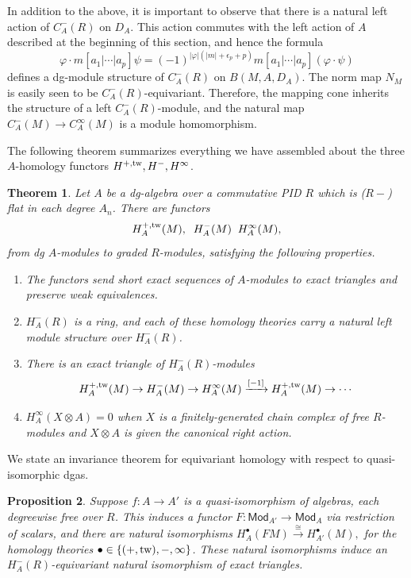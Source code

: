 \documentclass{memo-l}
\newtheorem{theorem}{Theorem}[chapter]
\newtheorem{proposition}[theorem]{Proposition}
\theoremstyle{definition}
\theoremstyle{remark}
\numberwithin{section}{chapter}
\numberwithin{equation}{chapter}
\begin{document}
In addition to the above, it is important to observe that there is a natural left action of $C^-_A(R)$ on $D_A$. This action commutes with the left action of $A$ described at the beginning of this section, and hence the formula $$\varphi \cdot m[a_1 | \cdots | a_p] \psi = (-1)^{|\varphi|(|m| + \epsilon_p+p)} m[a_1 | \cdots | a_p] (\varphi \cdot \psi)$$ defines a dg-module structure of $C^-_A(R)$ on $B(M, A, D_A).$ The norm map $N_M$ is easily seen to be $C^-_A(R)$-equivariant. Therefore, the mapping cone inherits the structure of a left $C^-_A(R)$-module, and the natural map $C^-_A(M) \to C^\infty_A(M)$ is a module homomorphism.

The following theorem summarizes everything we have assembled about the three $A$-homology functors $H^{+,\textup{tw}}, H^-, H^\infty$.

\begin{theorem}\label{eq-package}
Let $A$ be a dg-algebra over a commutative PID $R$ which is ($R-$) flat in each degree $A_n$. There are functors $$H^{+,\textup{tw}}_A(M), \; \; H^-_A(M) \; \; H^\infty_A(M),$$
from dg $A$-modules to graded $R$-modules, satisfying the following properties.
\begin{enumerate}
    \item The functors send short exact sequences of $A$-modules to exact triangles and preserve weak equivalences.
    \item $H_A^-(R)$ is a ring, and each of these homology theories carry a natural left module structure over $H_A^-(R)$.
    \item There is an exact triangle of $H_A^-(R)$-modules $$H^{+,\textup{tw}}_A(M) \to H_A^-(M) \to H_A^\infty(M) \xrightarrow{[-1]} H^{+,\textup{tw}}_A(M) \to \cdots$$
    \item $H_A^\infty(X \otimes A) = 0$ when $X$ is a finitely-generated chain complex of free $R$-modules and $X \otimes A$ is given the canonical right action.
    \end{enumerate}
\end{theorem}

We state an invariance theorem for equivariant homology with respect to quasi-isomorphic dgas.

\begin{proposition}\label{dg-invar}Suppose $f: A\to A'$ is a quasi-isomorphism of algebras, each degreewise free over $R$. This induces a functor $F: \mathsf{Mod}_{A'} \to \mathsf{Mod}_A$ via restriction of scalars, and there are natural isomorphisms $H^\bullet_A(FM) \xrightarrow{\cong} H^\bullet_{A'}(M),$ for the homology theories $\bullet \in \{(+,\textup{tw}), -, \infty\}$. These natural isomorphisms induce an $H^-_A(R)$-equivariant natural isomorphism of exact triangles.
\end{proposition}
\end{document}
